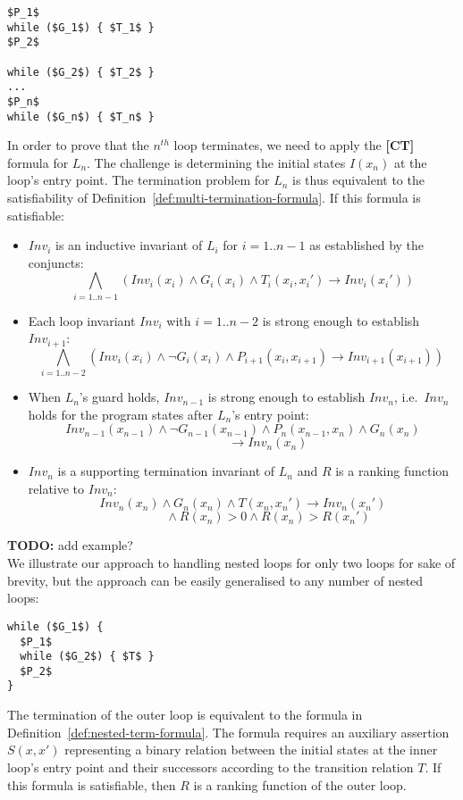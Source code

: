 \documentclass[preprint]{sigplanconf}
\theoremstyle{definition}
\newcommand{\todo}[1]{{\bf TODO:} #1}
\begin{document}
\begin{lstlisting}[mathescape=true]
$P_1$
while ($G_1$) { $T_1$ }
$P_2$

while ($G_2$) { $T_2$ }
...
$P_n$
while ($G_n$) { $T_n$ }
\end{lstlisting}

In order to prove that the $n^{th}$ loop terminates, we need to apply the {\bf [CT]} formula for $L_n$.
The challenge is determining the initial states  $I(x_n)$ at the loop's entry point.  
The termination problem for $L_n$ is thus equivalent to the satisfiability of
Definition~\ref{def:multi-termination-formula}.  If this formula is satisfiable:
\begin{itemize}
\item $Inv_i$ is an inductive invariant of $L_i$ for $i=1..{n-1}$ as established by the conjuncts:
$$\bigwedge_{i=1..n{-}1} (Inv_i(x_i) \wedge G_i(x_i) \wedge T_i(x_i, x_i') \rightarrow Inv_i(x_i')) $$

\item Each loop invariant $Inv_i$ with $i=1..{n-2}$ is strong enough to establish $Inv_{i+1}$:
$$\bigwedge_{i=1..n{-}2} (Inv_i(x_i) \wedge \lnot G_i(x_i) \wedge P_{i+1}(x_i, x_{i+1}) {\rightarrow} Inv_{i+1}(x_{i+1})) ~$$

\item When $L_n$'s guard holds, $Inv_{n-1}$ 
is strong enough to establish $Inv_n$, i.e.~$Inv_n$ holds for the program states after $L_n$'s entry point:
$$ Inv_{n-1}(x_{n-1}) \wedge \lnot G_{n-1}(x_{n-1}) \wedge P_n(x_{n-1},x_n) \wedge G_n(x_n) $$
$$\qquad\qquad\rightarrow Inv_n(x_n)$$

\item $Inv_n$ is a supporting termination invariant of $L_n$ and $R$ is a ranking function relative to $Inv_n$:
$$Inv_n(x_n) \wedge G_n(x_n) \wedge T(x_n, x_n') \rightarrow Inv_n(x_n')$$
$$ \qquad \qquad \wedge R(x_n) > 0 \wedge R(x_n) > R(x_n')$$
\end{itemize}

\todo{add example?}\\

%
We illustrate our approach to handling nested loops for only two loops for
sake of brevity, but the approach can be easily generalised to any number of
nested loops:
%
\begin{lstlisting}[mathescape=true]
while ($G_1$) { 
  $P_1$ 
  while ($G_2$) { $T$ }
  $P_2$
}
\end{lstlisting}

The termination of the outer loop is equivalent to the formula in
Definition~\ref{def:nested-term-formula}.  The formula requires an auxiliary
assertion $S(x,x')$ representing a binary relation between the initial
states at the inner loop's entry point and their successors according to the
transition relation $T$.  If this formula is satisfiable, then $R$ is a
ranking function of the outer loop.
\end{document}
